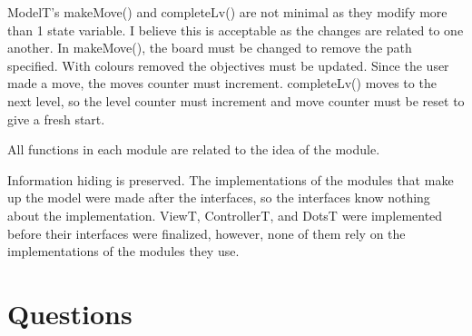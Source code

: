 \documentclass[12pt]{article}
\begin{document}
ModelT's makeMove() and completeLv() are not minimal as they modify more than 1 state variable. I believe this is acceptable as the changes are related to one another. In makeMove(), the board must be changed to remove the path specified. With colours removed the objectives must be updated. Since the user made a move, the moves counter must increment. completeLv() moves to the next level, so the level counter must increment and move counter must be reset to give a fresh start.

All functions in each module are related to the idea of the module.

Information hiding is preserved. The implementations of the modules that make up the model were made after the interfaces, so the interfaces know nothing about the implementation. ViewT, ControllerT, and DotsT were implemented before their interfaces were finalized, however, none of them rely on the implementations of the modules they use. 

\newpage

\section* {Questions}
\end{document}
